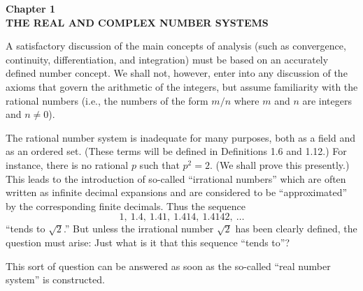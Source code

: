 \documentclass[11pt,twoside]{article}
\begin{document}
\newpage

\begin{center}
{\sffamily\LARGE\bfseries\color{RuInk} Chapter 1}\\[6pt]
{\sffamily\Large\bfseries\color{RuInk} THE REAL AND COMPLEX NUMBER SYSTEMS}
\end{center}


\noindent
A satisfactory discussion of the main concepts of analysis (such as convergence,
continuity, differentiation, and integration) must be based on an accurately
defined number concept. We shall not, however, enter into any discussion of the
axioms that govern the arithmetic of the integers, but assume familiarity with
the rational numbers (i.e., the numbers of the form $m/n$ where $m$ and $n$ are
integers and $n \ne 0$).

The rational number system is inadequate for many purposes, both as a field and
as an ordered set. (These terms will be defined in Definitions 1.6 and 1.12.)
For instance, there is no rational $p$ such that $p^2 = 2$. (We shall prove this
presently.) This leads to the introduction of so-called ``irrational numbers''
which are often written as infinite decimal expansions and are considered to be
``approximated'' by the corresponding finite decimals. Thus the sequence
\[ 1,\ 1.4,\ 1.41,\ 1.414,\ 1.4142,\ \dots \]
``tends to $\sqrt 2$.'' But unless the irrational number $\sqrt 2$ has been clearly
defined, the question must arise: Just what is it that this sequence ``tends
to''?

This sort of question can be answered as soon as the so-called ``real number
system'' is constructed.
\end{document}
